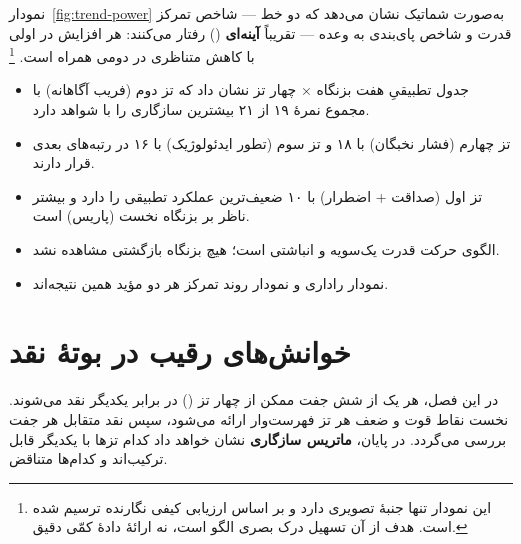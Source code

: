 \documentclass[12pt,a4paper]{book}
\newcommand{\keyword}[1]{\textbf{\textcolor{cPrimary}{#1}}}
\newcommand{\en}[1]{\lr{\textit{#1}}}
\begin{document}
نمودار~\ref{fig:trend-power} به‌صورت شماتیک نشان می‌دهد
که دو خط — شاخص تمرکز قدرت و شاخص پای‌بندی به وعده —
تقریباً \keyword{آینه‌ای} (\en{mirror-image})
رفتار می‌کنند:
هر افزایش در اولی با کاهش متناظری در دومی همراه است.%
\footnote{این نمودار تنها جنبهٔ تصویری دارد
و بر اساس ارزیابی کیفی نگارنده ترسیم شده است.
هدف از آن تسهیل درک بصری الگو است، نه ارائهٔ دادهٔ کمّی دقیق.}


\begin{principleBox}
\begin{itemize}
\item جدول تطبیقیِ هفت بزنگاه × چهار تز نشان داد که
      \textcolor{cAccent}{تز دوم (فریب آگاهانه)} با مجموع نمرهٔ ۱۹ از ۲۱
      بیشترین سازگاری را با شواهد دارد.
\item \textcolor{cConsolid}{تز چهارم (فشار نخبگان)} با ۱۸
      و \textcolor{cGold}{تز سوم (تطور ایدئولوژیک)} با ۱۶
      در رتبه‌های بعدی قرار دارند.
\item \textcolor{cGreen}{تز اول (صداقت + اضطرار)} با ۱۰
      ضعیف‌ترین عملکرد تطبیقی را دارد
      و بیشتر ناظر بر بزنگاه نخست (پاریس) است.
\item الگوی حرکت قدرت یک‌سویه و انباشتی است؛
      هیچ بزنگاه بازگشتی مشاهده نشد.
\item نمودار راداری و نمودار روند تمرکز
      هر دو مؤید همین نتیجه‌اند.
\end{itemize}
\end{principleBox}


\chapter{خوانش‌های رقیب در بوتهٔ نقد}
\label{ch:mutual-critique}

\begin{infoBox}
در این فصل، هر یک از شش جفت ممکن از چهار تز
(\en{$\binom{4}{2}=6$ pairs})
در برابر یکدیگر نقد می‌شوند.
نخست نقاط قوت و ضعف هر تز فهرست‌وار ارائه می‌شود،
سپس نقد متقابل هر جفت بررسی می‌گردد.
در پایان، \keyword{ماتریس سازگاری} نشان خواهد داد
کدام تزها با یکدیگر قابل ترکیب‌اند و کدام‌ها متناقض.
\end{infoBox}

\end{document}
